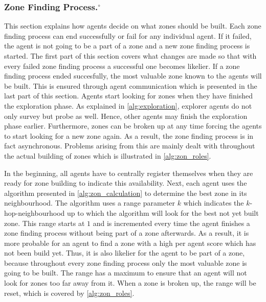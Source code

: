 \subsubsection[Zone Finding Process.]{Zone Finding Process.$^\circ$}\label{alg:zon_finding}
This section explains how agents decide on what zones should be built. Each zone finding process can end successfully or fail for any individual agent. If it failed, the agent is not going to be a part of a zone and a new zone finding process is started. The first part of this section covers what changes are made so that with every failed zone finding process a successful one becomes likelier. If a zone finding process ended succesfully, the most valuable zone known to the agents will be built. This is ensured through agent communication which is presented in the last part of this section.
Agents start looking for zones when they have finished the exploration phase. As explained in \autoref{alg:exploration}, explorer agents do not only survey but probe as well. Hence, other agents may finish the exploration phase earlier. Furthermore, zones can be broken up at any time forcing the agents to start looking for a new zone again. As a result, the zone finding process is in fact asynchronous. Problems arising from this are mainly dealt with throughout the actual building of zones which is illustrated in \autoref{alg:zon_roles}.

In the beginning, all agents have to centrally register themselves when they are ready for zone building to indicate this availability. Next, each agent uses the algorithm presented in \autoref{alg:zon_calculation} to determine the best zone in its neighbourhood. The algorithm uses a range parameter $k$ which indicates the $k$-hop-neighbourhood up to which the algorithm will look for the best not yet built zone. This range starts at $1$ and is incremented every time the agent finishes a zone finding process without being part of a zone afterwards. As a result, it is more probable for an agent to find a zone with a high per agent score which has not been build yet. Thus, it is also likelier for the agent to be part of a zone, because throughout every zone finding process only the most valuable zone is going to be built. The range has a maximum to ensure that an agent will not look for zones too far away from it. When a zone is broken up, the range will be reset, which is covered by \autoref{alg:zon_roles}.

